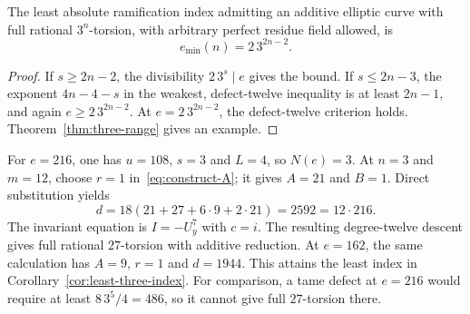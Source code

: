 \begin{corollary}\label{cor:least-three-index}
The least absolute ramification index admitting an additive elliptic curve with full rational $3^n$-torsion, with arbitrary perfect residue field allowed, is
\[
 e_{\min}(n)=2\,3^{2n-2}.
\]
\end{corollary}

\begin{proof}
If $s\ge2n-2$, the divisibility $2\,3^s\mid e$ gives the bound. If $s\le2n-3$, the exponent $4n-4-s$ in the weakest, defect-twelve inequality is at least $2n-1$, and again $e\ge2\,3^{2n-2}$. At $e=2\,3^{2n-2}$, the defect-twelve criterion holds. Theorem~\ref{thm:three-range} gives an example.
\end{proof}

\begin{example}\label{ex:twenty-seven}
For $e=216$, one has $u=108$, $s=3$ and $L=4$, so $N(e)=3$. At $n=3$ and $m=12$, choose $r=1$ in~\eqref{eq:construct-A}; it gives $A=21$ and $B=1$. Direct substitution yields
\[
 d=18(21+27+6\cdot9+2\cdot21)=2592=12\cdot216.
\]
The invariant equation is $I=-U_y^7$ with $c=i$. The resulting degree-twelve descent gives full rational $27$-torsion with additive reduction. At $e=162$, the same calculation has $A=9$, $r=1$ and $d=1944$. This attains the least index in Corollary~\ref{cor:least-three-index}. For comparison, a tame defect at $e=216$ would require at least $8\,3^5/4=486$, so it cannot give full $27$-torsion there.
\end{example}
